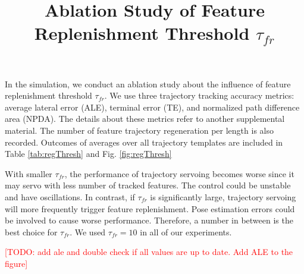 \documentclass[11pt]{article}
\title{Ablation Study of Feature Replenishment Threshold $\tau_{fr}$}
\newcommand{\TODO}[1]{\textcolor{red}{[TODO: #1]}}
\begin{document}
In the simulation, we conduct an ablation study about the influence of 
feature replenishment threshold $\tau_{fr}$. 
We use three trajectory tracking accuracy metrics: average lateral error (ALE),
terminal error (TE), and normalized path difference area (NPDA).
The details about these metrics refer to another supplemental material.
The number of feature trajectory regeneration per length is also recorded.
Outcomes of averages over all trajectory templates are included in 
Table \ref{tab:regThresh} and Fig. \ref{fig:regThresh}

With smaller $\tau_{fr}$, the performance of trajectory servoing becomes 
worse since it may servo with less number of tracked features. 
The control could be unstable and have oscillations. 
In contrast, if $\tau_{fr}$ is significantly large, trajectory servoing 
will more frequently trigger feature replenishment. 
Pose estimation errors could be involved to cause worse performance.
Therefore, a number in between is the best choice for $\tau_{fr}$. 
We used $\tau_{fr}=10$ in all of our experiments.

\TODO{add ale and double check if all values are up to date. Add ALE to the figure}

\begin{figure}[h]
\begin{minipage}[t]{\textwidth}
\centering
\vspace*{-0.5em}
\end{minipage}
\vspace*{-0.5em}
\end{figure}
\end{document}
